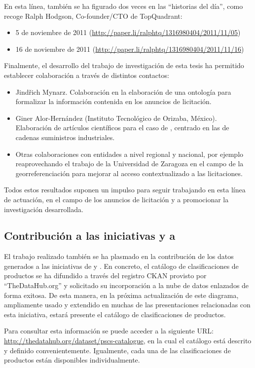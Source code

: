 En esta línea, también se ha figurado dos veces en las ``historias del día'', como recoge Ralph Hodgson, Co-founder/CTO de TopQuadrant:
\begin{itemize}
 \item 5 de noviembre de 2011 (\url{http://paper.li/ralphtq/1316980404/2011/11/05})
 \item 16 de noviembre de 2011 (\url{http://paper.li/ralphtq/1316980404/2011/11/16})
\end{itemize}

Finalmente, el desarrollo del trabajo de investigación de esta tesis ha permitido establecer colaboración a través
de distintos contactos:
\begin{itemize}
 \item Jindřich Mynarz. Colaboración en la elaboración de una ontología para formalizar la información
contenida en los anuncios de licitación.
\item Giner Alor-Hernández (Instituto Tecnológico de Orizaba, México). Elaboración de artículos científicos para el 
caso de \eproc, centrado en las de cadenas suministros industriales.
\item Otras colaboraciones con entidades a nivel regional y nacional, por ejemplo reaprovechando el trabajo de la Universidad de Zaragoza 
en el campo de la georreferenciación para mejorar al acceso contextualizado a las licitaciones.
\end{itemize}

Todos estos resultados suponen un impulso para seguir trabajando en esta línea de actuación, en el campo de los
anuncios de licitación y a promocionar la investigación desarrollada.


\subsection{Contribución a las iniciativas \linkeddata y a \lod}
El trabajo realizado también se ha plasmado en la contribución de los datos generados a las iniciativas 
de \linkeddata y \lod. En concreto, el catálogo de clasificaciones de productos se ha difundido 
a través del registro \gls{CKAN} provisto por ``TheDataHub.org'' y solicitado su incorporación 
a la nube de datos enlazados de forma exitosa. De esta manera, en la próxima 
actualización de este diagrama, ampliamente usado y extendido en muchas de las presentaciones 
relacionadas con esta iniciativa, estará presente el catálogo de clasificaciones de productos.

Para consultar esta información se puede acceder a la siguiente \gls{URL}: \url{http://thedatahub.org/dataset/pscs-catalogue}, 
en la cual el catálogo está descrito y definido convenientemente. Igualmente, cada una de las clasificaciones de productos 
están disponibles individualmente. 

